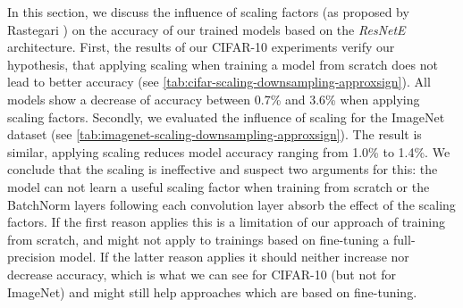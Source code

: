 \documentclass[10pt,twocolumn,letterpaper]{article}
\newcommand{\architecture}[1]{\emph{#1}}
\begin{document}
\begin{table}[]
\begin{tabular}{|l|l|l|l|}
\end{tabular}
\label{tab:imagenet-scaling-downsampling-approxsign}
\end{table}%

In this section, we discuss the influence of scaling factors (as proposed by Rastegari \etal\cite{Rastegari2016}) on the accuracy of our trained models based on the \architecture{ResNetE} architecture.
First, the results of our CIFAR-10 experiments verify our hypothesis, that applying scaling when training a model from scratch does not lead to better accuracy (see \autoref{tab:cifar-scaling-downsampling-approxsign}).
All models show a decrease of accuracy between 0.7\% and 3.6\% when applying scaling factors.
Secondly, we evaluated the influence of scaling for the ImageNet dataset (see \autoref{tab:imagenet-scaling-downsampling-approxsign}).
The result is similar, applying scaling reduces model accuracy ranging from 1.0\% to 1.4\%.
We conclude that the scaling is ineffective and suspect two arguments for this:
the model can not learn a useful scaling factor when training from scratch or the BatchNorm layers following each convolution layer absorb the effect of the scaling factors.
If the first reason applies this is a limitation of our approach of training from scratch, and might not apply to trainings based on fine-tuning a full-precision model.
If the latter reason applies it should neither increase nor decrease accuracy, which is what we can see for CIFAR-10 (but not for ImageNet) and might still help approaches which are based on fine-tuning.
\end{document}
